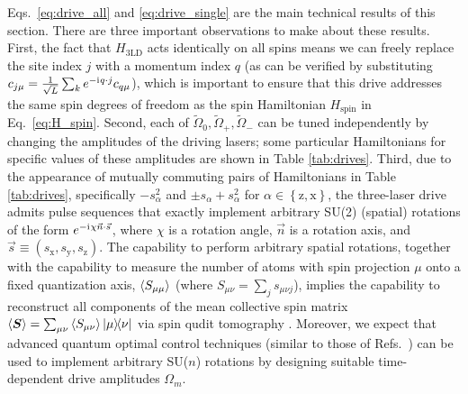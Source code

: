 \documentclass[nofootinbib,twocolumn]{revtex4-2}
\renewcommand{\t}{\text} %
\renewcommand{\set}[1]{\left\{#1\right\}} %
\newcommand{\bk}{\Braket} %
\renewcommand{\v}{\bm} %
\renewcommand{\c}{\cdot} %
\renewcommand{\i}{\mathrm{i}\mkern1mu} %
\newcommand{\1}{\mathds{1}}
\newcommand{\x}{\text{x}}
\newcommand{\y}{\text{y}}
\newcommand{\z}{\text{z}}
\begin{document}
Eqs.~\eqref{eq:drive_all} and \eqref{eq:drive_single} are the main technical results of this section.
There are three important observations to make about these results.
First, the fact that $H_{\t{3LD}}$ acts identically on all spins means we can freely replace the site index $j$ with a momentum index $q$ (as can be verified by substituting $c_{j\mu}=\frac1{\sqrt{L}}\sum_k e^{-\i q\c j} c_{q\mu}$), which is important to ensure that this drive addresses the same spin degrees of freedom as the spin Hamiltonian $H_{\t{spin}}$ in Eq.~\eqref{eq:H_spin}.
Second, each of $\tilde\Omega_0,\tilde\Omega_+,\tilde\Omega_-$ can be tuned independently by changing the amplitudes of the driving lasers; some particular Hamiltonians for specific values of these amplitudes are shown in Table \ref{tab:drives}.
Third, due to the appearance of mutually commuting pairs of Hamiltonians in Table \ref{tab:drives}, specifically $-s_\alpha^2$ and $\pm s_\alpha+s_\alpha^2$ for $\alpha\in\set{\z,\x}$, the three-laser drive admits pulse sequences that exactly implement arbitrary SU(2) (spatial) rotations of the form $e^{-\i\chi\vec n\c\vec s}$, where $\chi$ is a rotation angle, $\vec n$ is a rotation axis, and $\vec s\equiv(s_\x,s_\y,s_\z)$.
The capability to perform arbitrary spatial rotations, together with the capability to measure the number of atoms with spin projection $\mu$ onto a fixed quantization axis, $\bk{S_{\mu\mu}}$ (where $S_{\mu\nu}=\sum_js_{\mu\nu j}$), implies the capability to reconstruct all components of the mean collective spin matrix $\bk{\v S}=\sum_{\mu\nu}\bk{S_{\mu\nu}}\op{\mu}{\nu}$ via spin qudit tomography \cite{newton1968measurability, perlin2020qudit}.
Moreover, we expect that advanced quantum optimal control techniques (similar to those of Refs.~\cite{anderson2015accurate, lucarelli2018quantum}) can be used to implement arbitrary SU($n$) rotations by designing suitable time-dependent drive amplitudes $\Omega_m$.
\end{document}
